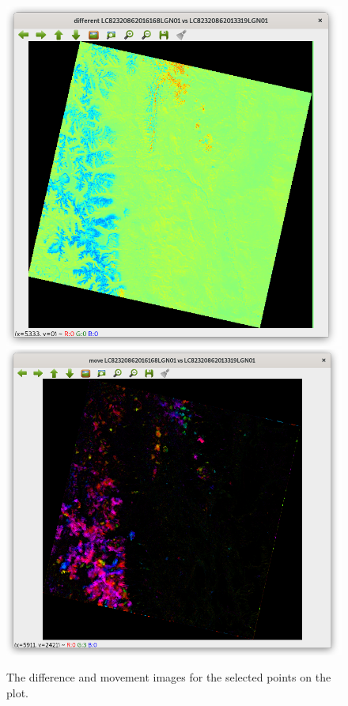 \documentclass[12pt, a4paper]{report}
\begin{document}
	\begin{figure}[H]
		\includegraphics[width=\linewidth]{difference_plot.png}
		\endminipage\hfill
		\includegraphics[width=\linewidth]{movement_plot.png}
		\endminipage\hfill
		\caption{The difference and movement images for the selected points on the plot.}\label{fig:difference_movement_gui}
	\end{figure}
	
\end{document}
